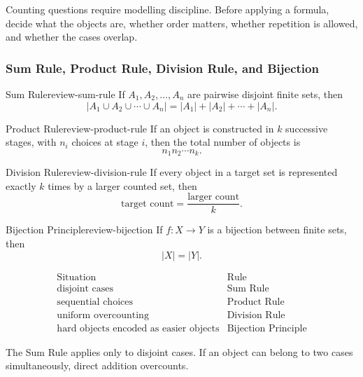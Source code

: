 Counting questions require modelling discipline. Before applying a formula, decide what the objects are, whether order matters, whether repetition is allowed, and whether the cases overlap.

\subsubsection{Sum Rule, Product Rule, Division Rule, and Bijection}

\begin{theorem}{Sum Rule}{review-sum-rule}
If \(A_1,A_2,\dots,A_n\) are pairwise disjoint finite sets, then
\[
|A_1\cup A_2\cup\cdots\cup A_n|
=
|A_1|+|A_2|+\cdots+|A_n|.
\]
\end{theorem}

\begin{theorem}{Product Rule}{review-product-rule}
If an object is constructed in \(k\) successive stages, with \(n_i\) choices at stage \(i\), then the total number of objects is
\[
n_1n_2\cdots n_k.
\]
\end{theorem}

\begin{theorem}{Division Rule}{review-division-rule}
If every object in a target set is represented exactly \(k\) times by a larger counted set, then
\[
\text{target count}
=
\frac{\text{larger count}}{k}.
\]
\end{theorem}

\begin{theorem}{Bijection Principle}{review-bijection}
If \(f:X\to Y\) is a bijection between finite sets, then
\[
|X|=|Y|.
\]
\end{theorem}

\begin{examtip}[title={Which basic rule should be used?}]
\[
\begin{array}{c|c}
\text{Situation} & \text{Rule} \\ \hline
\text{disjoint cases} & \text{Sum Rule} \\
\text{sequential choices} & \text{Product Rule} \\
\text{uniform overcounting} & \text{Division Rule} \\
\text{hard objects encoded as easier objects} & \text{Bijection Principle}
\end{array}
\]
\end{examtip}

\begin{commonmistake}[title={Adding before checking disjointness}]
The Sum Rule applies only to disjoint cases. If an object can belong to two cases simultaneously, direct addition overcounts.
\end{commonmistake}

